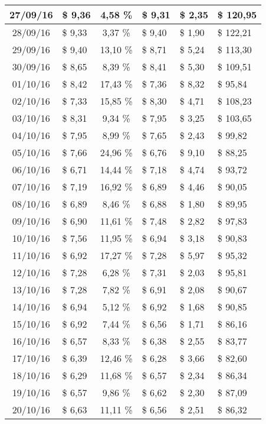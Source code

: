 \begin{center}
\begin{small}
\begin{longtable}{|c|l|c|l|l|l|}
27/09/16 & \$ 9,36 & 4,58 \% & \$ 9,31 & \$ 2,35 & \$ 120,95 \\ \hline
28/09/16 & \$ 9,33 & 3,37 \% & \$ 9,40 & \$ 1,90 & \$ 122,21 \\ \hline
29/09/16 & \$ 9,40 & 13,10 \% & \$ 8,71 & \$ 5,24 & \$ 113,30 \\ \hline
30/09/16 & \$ 8,65 & 8,39 \% & \$ 8,41 & \$ 5,30 & \$ 109,51 \\ \hline
01/10/16 & \$ 8,42 & 17,43 \% & \$ 7,36 & \$ 8,32 & \$ 95,84 \\ \hline
02/10/16 & \$ 7,33 & 15,85 \% & \$ 8,30 & \$ 4,71 & \$ 108,23 \\ \hline
03/10/16 & \$ 8,31 & 9,34 \% & \$ 7,95 & \$ 3,25 & \$ 103,65 \\ \hline
04/10/16 & \$ 7,95 & 8,99 \% & \$ 7,65 & \$ 2,43 & \$ 99,82 \\ \hline
05/10/16 & \$ 7,66 & 24,96 \% & \$ 6,76 & \$ 9,10 & \$ 88,25 \\ \hline
06/10/16 & \$ 6,71 & 14,44 \% & \$ 7,18 & \$ 4,74 & \$ 93,72 \\ \hline
07/10/16 & \$ 7,19 & 16,92 \% & \$ 6,89 & \$ 4,46 & \$ 90,05 \\ \hline
08/10/16 & \$ 6,89 & 8,46 \% & \$ 6,88 & \$ 1,80 & \$ 89,95 \\ \hline
09/10/16 & \$ 6,90 & 11,61 \% & \$ 7,48 & \$ 2,82 & \$ 97,83 \\ \hline
10/10/16 & \$ 7,56 & 11,95 \% & \$ 6,94 & \$ 3,18 & \$ 90,83 \\ \hline
11/10/16 & \$ 6,92 & 17,27 \% & \$ 7,28 & \$ 5,97 & \$ 95,32 \\ \hline
12/10/16 & \$ 7,28 & 6,28 \% & \$ 7,31 & \$ 2,03 & \$ 95,81 \\ \hline
13/10/16 & \$ 7,28 & 7,82 \% & \$ 6,91 & \$ 2,08 & \$ 90,67 \\ \hline
14/10/16 & \$ 6,94 & 5,12 \% & \$ 6,92 & \$ 1,68 & \$ 90,85 \\ \hline
15/10/16 & \$ 6,92 & 7,44 \% & \$ 6,56 & \$ 1,71 & \$ 86,16 \\ \hline
16/10/16 & \$ 6,57 & 8,33 \% & \$ 6,38 & \$ 2,55 & \$ 83,77 \\ \hline
17/10/16 & \$ 6,39 & 12,46 \% & \$ 6,28 & \$ 3,66 & \$ 82,60 \\ \hline
18/10/16 & \$ 6,29 & 11,68 \% & \$ 6,57 & \$ 2,34 & \$ 86,34 \\ \hline
19/10/16 & \$ 6,57 & 9,86 \% & \$ 6,62 & \$ 2,30 & \$ 87,09 \\ \hline
20/10/16 & \$ 6,63 & 11,11 \% & \$ 6,56 & \$ 2,51 & \$ 86,32 \\ \hline

\end{longtable}
\end{small}
\end{center}
